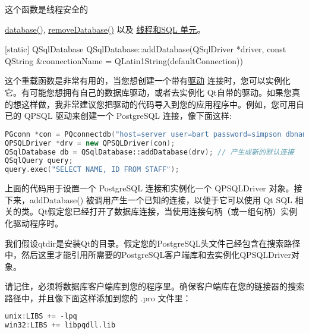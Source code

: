 \begin{notice}
这个函数是线程安全的
\end{notice}


\begin{notice}[另请查阅]
\href{https://github.com/QtDocumentCN/QtDocumentCN/blob/master/Src/S/QSqlDatabase/QSqlDatabase.md#static-qsqldatabase-qsqldatabasedatabaseconst-qstring-connectionname--qlatin1stringdefaultconnection-bool-open--true}{database()}, \href{https://github.com/QtDocumentCN/QtDocumentCN/blob/master/Src/S/QSqlDatabase/QSqlDatabase.md#static-void-qsqldatabaseremovedatabaseconst-qstring-connectionname}{removeDatabase()} 以及 \href{https://doc.qt.io/qt-5/threads-modules.html#threads-and-the-sql-module}{ 线程和SQL 单元}。
\end{notice}


[static] QSqlDatabase QSqlDatabase::addDatabase(QSqlDriver *driver, const QString \&connectionName = QLatin1String(defaultConnection))

这个重载函数是非常有用的，当您想创建一个带有\href{https://doc.qt.io/qt-5/qsqldriver.html}{驱动} 连接时，您可以实例化它。有可能您想拥有自己的数据库驱动，或者去实例化 Qt自带的驱动。如果您真的想这样做，我非常建议您把驱动的代码导入到您的应用程序中。例如，您可用自已的 QPSQL 驱动来创建一个 PostgreSQL 连接，像下面这样:

\begin{lstlisting}[language=C++]
PGconn *con = PQconnectdb("host=server user=bart password=simpson dbname=springfield");
QPSQLDriver *drv = new QPSQLDriver(con);
QSqlDatabase db = QSqlDatabase::addDatabase(drv); // 产生成新的默认连接
QSqlQuery query;
query.exec("SELECT NAME, ID FROM STAFF");	
\end{lstlisting}

上面的代码用于设置一个 PostgreSQL 连接和实例化一个 QPSQLDriver 对象。接下来，addDatabase() 被调用产生一个已知的连接，以便于它可以使用 Qt SQL 相关的类。Qt假定您已经打开了数据库连接，当使用连接句柄（或一组句柄）实例化驱动程序时。

\begin{notice}
我们假设qtdir是安装Qt的目录。假定您的PostgreSQL头文件己经包含在搜索路径中，然后这里才能引用所需要的PostgreSQL客户端库和去实例化QPSQLDriver对象。
\end{notice}



请记住，必须将数据库客户端库到您的程序里。确保客户端库在您的链接器的搜索路径中，并且像下面这样添加到您的 .pro 文件里：

\begin{lstlisting}[language=C++]
unix:LIBS += -lpq
win32:LIBS += libpqdll.lib
\end{lstlisting}

